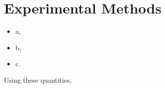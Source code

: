 

\chapter{Experimental Methods}	\label{ch::methods}


\begin{itemize}
	\item a,
	\item b,
	\item c.
\end{itemize}

\noindent%
Using these quantities, 







